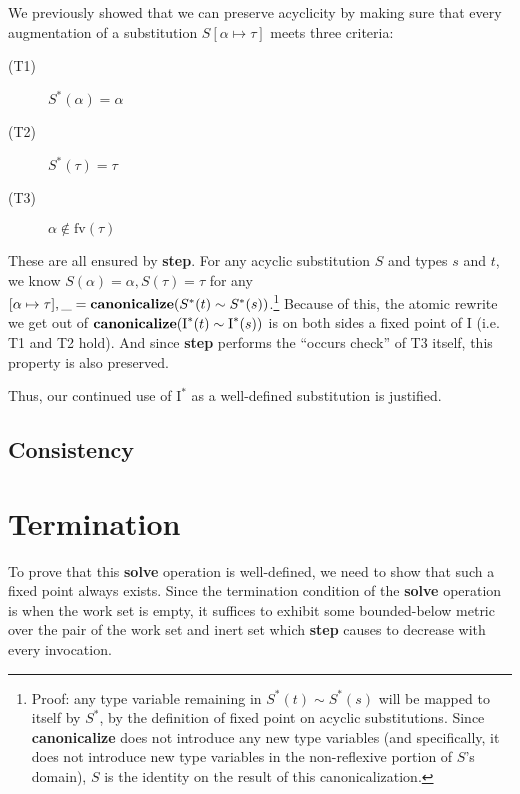 \documentclass[10pt, letterpaper, oneside]{article}
\newcommand{\inertset}{\text{I}}
\newcommand{\fv}{\mathrm{fv}}
\begin{document}
We previously showed that we can preserve acyclicity by making sure that every augmentation of a substitution \(S[\alpha \mapsto \tau]\) meets three criteria:
\begin{description}
\item[(T1)] \(S^\ast(\alpha) = \alpha\)
\item[(T2)] \(S^\ast(\tau) = \tau\)
\item[(T3)] \(\alpha \notin \fv(\tau)\)
\end{description}
These are all ensured by \textbf{step}. For any acyclic substitution \(S\) and types \(s\) and \(t\), we know \(S(\alpha) = \alpha, S(\tau) = \tau\) for any \([\alpha \mapsto \tau], \_ = \text{\bf canonicalize}(S^\ast(t) \sim S^\ast(s))\).\footnote{Proof: any type variable remaining in \(S^\ast(t) \sim S^\ast(s)\) will be mapped to itself by \(S^\ast\), by the definition of fixed point on acyclic substitutions. Since \textbf{canonicalize} does not introduce any new type variables (and specifically, it does not introduce new type variables in the non-reflexive portion of \(S\)'s domain), \(S\) is the identity on the result of this canonicalization.} Because of this, the atomic rewrite we get out of \(\text{\bf canonicalize}(\inertset^\ast(t) \sim \inertset^\ast(s))\) is on both sides a fixed point of \(\inertset\) (i.e. T1 and T2 hold). And since \textbf{step} performs the ``occurs check'' of T3 itself, this property is also preserved.

Thus, our continued use of \(\inertset^\ast\) as a well-defined substitution is justified.

\subsection{Consistency}




\section{Termination}

To prove that this \textbf{solve} operation is well-defined, we need to show that such a fixed point always exists. Since the termination condition of the \textbf{solve} operation is when the work set is empty, it suffices to exhibit some bounded-below metric over the pair of the work set and inert set which \textbf{step} causes to decrease with every invocation.
\end{document}
